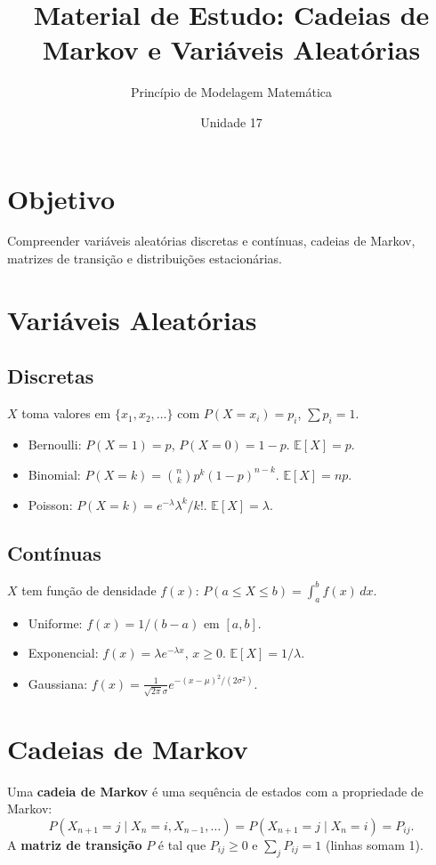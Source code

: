 \documentclass[12pt,a4paper]{article}
\title{Material de Estudo: Cadeias de Markov e Vari\'aveis Aleat\'orias}
\author{Princ\'ipio de Modelagem Matem\'atica}
\date{Unidade 17}
\begin{document}
\maketitle

\section*{Objetivo}
Compreender vari\'aveis aleat\'orias discretas e cont\'inuas, cadeias de Markov, matrizes de transi\c{c}\~ao e distribui\c{c}\~oes estacion\'arias.

\section*{Vari\'aveis Aleat\'orias}

\subsection*{Discretas}
$X$ toma valores em $\{x_1, x_2, \ldots\}$ com $P(X=x_i) = p_i$, $\sum p_i = 1$.
\begin{itemize}
  \item Bernoulli: $P(X=1)=p$, $P(X=0)=1-p$. $\mathbb{E}[X]=p$.
  \item Binomial: $P(X=k) = \binom{n}{k}p^k(1-p)^{n-k}$. $\mathbb{E}[X]=np$.
  \item Poisson: $P(X=k) = e^{-\lambda}\lambda^k/k!$. $\mathbb{E}[X]=\lambda$.
\end{itemize}

\subsection*{Cont\'inuas}
$X$ tem fun\c{c}\~ao de densidade $f(x)$: $P(a\le X\le b) = \int_a^b f(x)\,dx$.
\begin{itemize}
  \item Uniforme: $f(x) = 1/(b-a)$ em $[a,b]$.
  \item Exponencial: $f(x) = \lambda e^{-\lambda x}$, $x\ge0$. $\mathbb{E}[X]=1/\lambda$.
  \item Gaussiana: $f(x) = \frac{1}{\sqrt{2\pi}\sigma}e^{-(x-\mu)^2/(2\sigma^2)}$.
\end{itemize}

\section*{Cadeias de Markov}

Uma \textbf{cadeia de Markov} \'e uma sequ\^encia de estados com a propriedade de Markov:
\[
P(X_{n+1}=j \mid X_n=i, X_{n-1}, \ldots) = P(X_{n+1}=j \mid X_n=i) = P_{ij}.
\]
A \textbf{matriz de transi\c{c}\~ao} $P$ \'e tal que $P_{ij} \ge 0$ e $\sum_j P_{ij} = 1$ (linhas somam 1).
\end{document}
